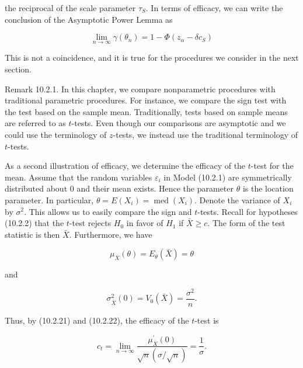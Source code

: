 the reciprocal of the scale parameter $\tau_{S}$. In terms of efficacy, we can write the conclusion of the Asymptotic Power Lemma as


\begin{equation*}
\lim _{n \rightarrow \infty} \gamma\left(\theta_{n}\right)=1-\Phi\left(z_{\alpha}-\delta c_{S}\right) \tag{10.2.20}
\end{equation*}


This is not a coincidence, and it is true for the procedures we consider in the next section.

Remark 10.2.1. In this chapter, we compare nonparametric procedures with traditional parametric procedures. For instance, we compare the sign test with the test based on the sample mean. Traditionally, tests based on sample means are referred to as $t$-tests. Even though our comparisons are asymptotic and we could use the terminology of $z$-tests, we instead use the traditional terminology of $t$-tests.

As a second illustration of efficacy, we determine the efficacy of the $t$-test for the mean. Assume that the random variables $\varepsilon_{i}$ in Model (10.2.1) are symmetrically distributed about 0 and their mean exists. Hence the parameter $\theta$ is the location parameter. In particular, $\theta=E\left(X_{i}\right)=\operatorname{med}\left(X_{i}\right)$. Denote the variance of $X_{i}$ by $\sigma^{2}$. This allows us to easily compare the sign and $t$-tests. Recall for hypotheses (10.2.2) that the $t$-test rejects $H_{0}$ in favor of $H_{1}$ if $\bar{X} \geq c$. The form of the test statistic is then $\bar{X}$. Furthermore, we have


\begin{equation*}
\mu_{\bar{X}}(\theta)=E_{\theta}(\bar{X})=\theta \tag{10.2.21}
\end{equation*}


and


\begin{equation*}
\sigma_{\bar{X}}^{2}(0)=V_{0}(\bar{X})=\frac{\sigma^{2}}{n} . \tag{10.2.22}
\end{equation*}


Thus, by (10.2.21) and (10.2.22), the efficacy of the $t$-test is


\begin{equation*}
c_{t}=\lim _{n \rightarrow \infty} \frac{\mu_{\bar{X}}^{\prime}(0)}{\sqrt{n}(\sigma / \sqrt{n})}=\frac{1}{\sigma} . \tag{10.2.23}
\end{equation*}


